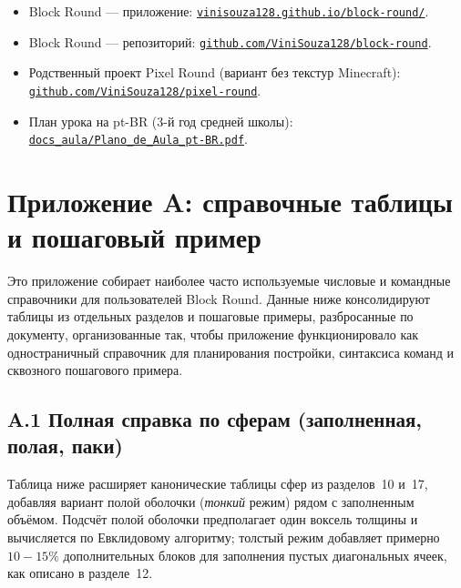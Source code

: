 \documentclass[12pt,a4paper]{scrartcl}
\newcommand{\biblink}[2]{\href{#1}{\nolinkurl{#2}}}
\begin{document}
\begin{itemize}[leftmargin=1.4em,itemsep=0.3em,topsep=0.3em]
  \item Block Round --- приложение: \biblink{https://vinisouza128.github.io/block-round/}{vinisouza128.github.io/block-round/}.
  \item Block Round --- репозиторий: \biblink{https://github.com/ViniSouza128/block-round}{github.com/ViniSouza128/block-round}.
  \item Родственный проект Pixel Round (вариант без текстур Minecraft):
        \biblink{https://github.com/ViniSouza128/pixel-round}{github.com/ViniSouza128/pixel-round}.
  \item План урока на pt-BR (3-й год средней школы):
        \biblink{https://vinisouza128.github.io/block-round/docs_aula/Plano_de_Aula_pt-BR.pdf}{docs\_aula/Plano\_de\_Aula\_pt-BR.pdf}.
\end{itemize}


\clearpage

\section*{\color{accent}Приложение A: справочные таблицы и пошаговый пример}

Это приложение собирает наиболее часто используемые числовые и командные справочники для пользователей Block Round. Данные ниже консолидируют таблицы из отдельных разделов и пошаговые примеры, разбросанные по документу, организованные так, чтобы приложение функционировало как одностраничный справочник для планирования постройки, синтаксиса команд и сквозного пошагового примера.

\subsection*{A.1 Полная справка по сферам (заполненная, полая, паки)}
Таблица ниже расширяет канонические таблицы сфер из разделов~10 и~17, добавляя вариант полой оболочки (\emph{тонкий} режим) рядом с заполненным объёмом. Подсчёт полой оболочки предполагает один воксель толщины и вычисляется по Евклидовому алгоритму; толстый режим добавляет примерно $10{-}15\%$ дополнительных блоков для заполнения пустых диагональных ячеек, как описано в разделе~12.
\end{document}

